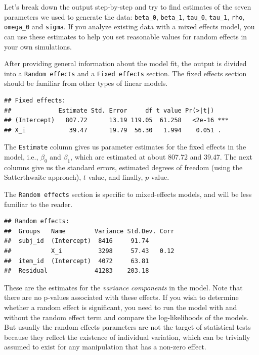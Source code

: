 \documentclass[
  english,
  doc,floatsintext]{apa6}
\begin{document}
\noindent Let's break down the output step-by-step and try to find estimates of the seven parameters we used to generate the data: \texttt{beta\_0}, \texttt{beta\_1}, \texttt{tau\_0}, \texttt{tau\_1}, \texttt{rho}, \texttt{omega\_0} and \texttt{sigma}. If you analyze existing data with a mixed effects model, you can use these estimates to help you set reasonable values for random effects in your own simulations.

After providing general information about the model fit, the output is divided into a \texttt{Random\ effects} and a \texttt{Fixed\ effects} section. The fixed effects section should be familiar from other types of linear models.

\begin{verbatim}
## Fixed effects:
##             Estimate Std. Error     df t value Pr(>|t|)    
## (Intercept)   807.72      13.19 119.05  61.258   <2e-16 ***
## X_i            39.47      19.79  56.30   1.994    0.051 .
\end{verbatim}

\noindent The \texttt{Estimate} column gives us parameter estimates for the fixed effects in the model, i.e., \(\beta_0\) and \(\beta_1\), which are estimated at about 807.72 and 39.47. The next columns give us the standard errors, estimated degrees of freedom (using the Satterthwaite approach), \(t\) value, and finally, \(p\) value.

The \texttt{Random\ effects} section is specific to mixed-effects models, and will be less familiar to the reader.

\begin{verbatim}
## Random effects:
##  Groups   Name        Variance Std.Dev. Corr
##  subj_id  (Intercept)  8416     91.74       
##           X_i          3298     57.43   0.12
##  item_id  (Intercept)  4072     63.81       
##  Residual             41283    203.18
\end{verbatim}

\noindent These are the estimates for the \emph{variance components} in the model. Note that there are no p-values associated with these effects. If you wish to determine whether a random effect is significant, you need to run the model with and without the random effect term and compare the log-likelihoods of the models. But usually the random effects parameters are not the target of statistical tests because they reflect the existence of individual variation, which can be trivially assumed to exist for any manipulation that has a non-zero effect.
\end{document}
